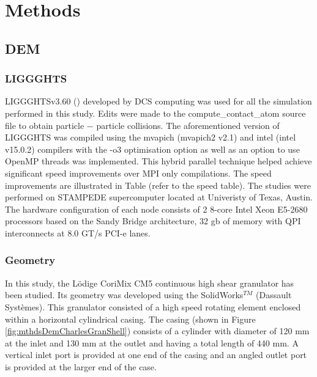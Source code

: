 \documentclass[preprint,11pt,authoryear]{elsarticle}
\begin{document}
	
	
	\section{Methods}
	
	  \subsection{DEM}
	    \subsubsection{LIGGGHTS}
	    	\par LIGGGHTSv3.60 (\cite{Kloss2012}) developed by DCS computing was used for all the simulation performed in this study. Edits were made to the compute\_contact\_atom source file to obtain particle $-$ particle collisions. The aforementioned version of LIGGGHTS was compiled using the mvapich (mvapich2 v2.1) and intel (intel v15.0.2) compilers with the -o3 optimisation option as well as an option to use OpenMP threads was implemented. This hybrid parallel technique helped achieve significant speed improvements over MPI only compilations. The speed improvements are illustrated in Table (refer to the speed table). The studies were performed on STAMPEDE supercomputer located at Univeristy of Texas, Austin. The hardware configuration of each node consists of 2 8-core Intel Xeon E5-2680 processors based on the Sandy Bridge architecture, 32 gb of memory with QPI interconnects at 8.0 GT/s PCI-e lanes.

	        
	    \subsubsection{Geometry}    
	    
	    \par In this study, the L\"{o}dige CoriMix CM5 continuous high shear granulator has been studied. Its geometry was developed using the SolidWorks$^{TM}$ (Dassault Syst\`{e}mes). This granulator consisted of a high speed rotating element enclosed within a horizontal cylindrical casing. The casing (shown in Figure \ref{fig:mthdsDemCharlesGranShell}) consists of a cylinder with diameter of 120 mm at the inlet and 130 mm at the outlet and having a total length of 440 mm. A vertical inlet port is provided at one end of the casing and an angled outlet port is provided at the larger end of the case. 
	
\end{document}
